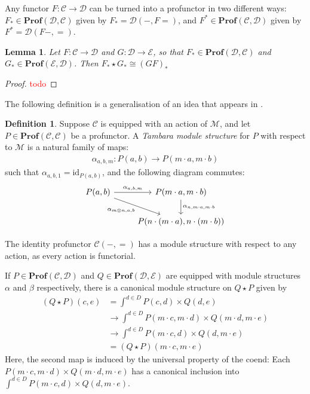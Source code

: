 \documentclass[11pt,a4paper]{amsart}
\theoremstyle{plain}
\newtheorem{lemma}[theorem]{Lemma}
\theoremstyle{definition}
\newtheorem{definition}[theorem]{Definition}
\newcommand{\id}{\mathrm{id}}
\newcommand{\C}{\mathscr{C}}
\newcommand{\D}{\mathscr{D}}
\newcommand{\E}{\mathscr{E}}
\newcommand{\M}{\mathscr{M}}
\newcommand{\Prof}{\mathbf{Prof}}
\newcommand{\todo}[1]{\textcolor{red}{\small #1}}
\begin{document}
Any functor $F : \C \to \D$ can be turned into a profunctor in two different ways: $F_* \in \Prof(\D, \C)$ given by $F_* = \D(-,F=)$, and  $F^* \in \Prof(\C, \D)$ given by $F^* = \D(F-,=)$.

\begin{lemma}\label{procomp-downstar-is-comp}
Let $F : \C \to \D$ and $G : \D \to \E$, so that $F_* \in \Prof(\D, \C)$ and $G_* \in \Prof(\E,\D)$. Then $F_* \star G_* \cong (GF)_*$
\end{lemma}
\begin{proof}
\todo{todo}
\end{proof}


The following definition is a generalisation of an idea that appears in \cite{MR2425558}.

\begin{definition}
Suppose $\C$ is equipped with an action of $\M$, and let $P \in \Prof(\C, \C)$ be a profunctor. A \emph{Tambara module structure} for $P$ with respect to $\M$ is a natural family of maps:
\begin{align*}
\alpha_{a,b,m} : P(a, b) \to P(m \cdot a, m \cdot b)
\end{align*}
such that $\alpha_{a,b,1} = \id_{P(a,b)}$, and the following diagram commutes:
\[
\begin{tikzcd}
P(a,b) \ar[r, "\alpha_{a,b,m}"] \ar[dr, "\alpha_{m\otimes n, a, b}" below left] & P(m \cdot a, m \cdot b) \ar[d, "\alpha_{n, m \cdot a, m \cdot b}" right] \\
& P(n \cdot (m \cdot a), n \cdot (m \cdot b))
\end{tikzcd}
\]
\end{definition}

The identity profunctor $\C(-,=)$ has a module structure with respect to any action, as every action is functorial.

If $P \in \Prof(\C, \D)$ and $Q \in \Prof(\D,\E)$ are equipped with module structures $\alpha$ and $\beta$ respectively, there is a canonical module structure on $Q \star P$ given by
\begin{align*}
(Q \star P)(c,e) &= \int^{d \in D} P(c,d) \times Q(d,e) \\ 
&\to \int^{d \in D} P(m \cdot c, m\cdot d) \times Q(m \cdot d, m \cdot e) \\
&\to \int^{d \in D} P(m \cdot c, d) \times Q(d, m \cdot e) \\
&= (Q \star P)(m \cdot c, m \cdot e)
\end{align*}
Here, the second map is induced by the universal property of the coend: Each $P(m \cdot c, m\cdot d) \times Q(m \cdot d, m \cdot e)$ has a canonical inclusion into $\int^{d \in D} P(m \cdot c, d) \times Q(d, m \cdot e)$.
\end{document}
